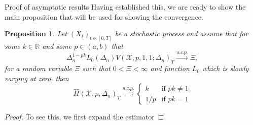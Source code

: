 \documentclass[fleqn,11pt,letterpaper]{article}
\theoremstyle{plain}
\newtheorem{proposition}{Proposition}[section]
\theoremstyle{definition}
\theoremstyle{remark}
\numberwithin{equation}{section}
\begin{document}
\begin{section}{Proof of asymptotic results}
Having established this, we are ready to show the main proposition that will be used for showing the convergence. 

\begin{proposition}\label{prop:convergence_general}
Let $(X_t)_{t\in[0,T]}$ be a stochastic process and assume that for some $k\in\mathbb{R}$ and some $p\in(a,b)$ that
\begin{equation}\label{eq:convergence_condition}
    \Delta_n^{1-pk}L_0(\Delta_n)V(\mathcal{X},p,1,1;\Delta_n)_T\overset{u.c.p.}{\longrightarrow}\Xi,
\end{equation}
for a random variable $\Xi$ such that $0<\Xi<\infty$ and function $L_0$ which is slowly varying at zero, then 
\begin{equation}
    \hat{H}(\mathcal{X},p,\Delta_n)_T \overset{u.c.p.}{\longrightarrow} \begin{cases}
k & \text{if }pk\neq1\\
1/p & \text{if }pk=1
\end{cases}
\end{equation}

\end{proposition}

\begin{proof}

To see this, we first expand the estimator


\end{proof}
\end{section}
\end{document}
